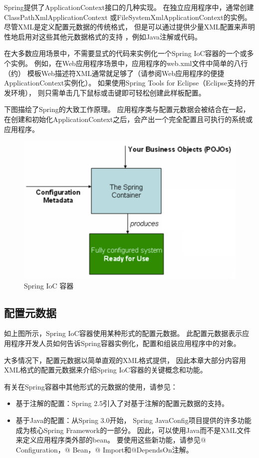 Spring提供了ApplicationContext接口的几种实现。 
在独立应用程序中，通常创建ClassPathXmlApplicationContext
或FileSystemXmlApplicationContext的实例。 
尽管XML是定义配置元数据的传统格式，
但是可以通过提供少量XML配置来声明性地启用对这些其他元数据格式的支持
，例如Java注解或代码。

在大多数应用场景中，不需要显式的代码来实例化一个Spring IoC容器的一个或多个实例。 
例如，在Web应用程序场景中，应用程序的web.xml文件中简单的八行（约）
模板Web描述符XML通常就足够了（请参阅Web应用程序的便捷ApplicationContext实例化）。
 如果使用Spring Tools for Eclipse（Eclipse支持的开发环境），
 则只需单击几下鼠标或击键即可轻松创建此样板配置。

 下图描绘了Spring的大致工作原理。 
 应用程序类与配置元数据会被结合在一起，
 在创建和初始化ApplicationContext之后，会产出一个完全配置且可执行的系统或应用程序。

 \begin{figure}[ht]
    \centering
    \includegraphics[width=0.6\linewidth]{./Figure/IMG_process.png}
    \caption{Spring IoC 容器}\label{Fig:xd1}
  \end{figure}

\subsection{配置元数据}
如上图所示，Spring IoC容器使用某种形式的配置元数据。 
此配置元数据表示应用程序开发人员如何告诉Spring容器实例化，配置和组装应用程序中的对象。

大多情况下，配置元数据以简单直观的XML格式提供，
因此本章大部分内容用XML格式的配置元数据来介绍Spring IoC容器的关键概念和功能。

有关在Spring容器中其他形式的元数据的使用，请参见：

\begin{itemize}
    \item 基于注解的配置：Spring 2.5引入了对基于注解的配置元数据的支持。
    \item 基于Java的配置：从Spring 3.0开始，
    Spring JavaConfig项目提供的许多功能成为核心Spring Framework的一部分。 
    因此，可以使用Java而不是XML文件来定义应用程序类外部的bean。
     要使用这些新功能，请参见@ Configuration，@ Bean，@ Import和@DependsOn注解。
\end{itemize}

